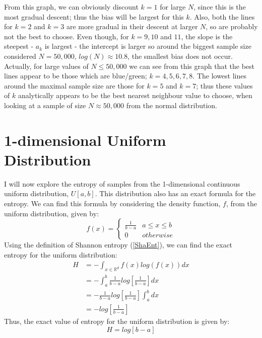 \documentclass[12pt]{report}
\begin{document}
From this graph, we can obviously discount $k=1$ for large $N$, since this is the most gradual descent; thus the bias will be largest for this $k$. Also, both the lines for $k=2$ and $k=3$ are more gradual in their descent at larger $N$, so are probably not the best to choose. Even though, for $k=9, 10$ and $11$, the slope is the steepest - $a_{k}$ is largest - the intercept is larger so around the biggest sample size considered $N=50,000$, $log(N) \approx 10.8$, the smallest bias does not occur. Actually, for large values of $N \leq 50,000$ we can see from this graph that the best lines appear to be those which are blue/green; $k = 4, 5, 6, 7, 8$. The lowest lines around the maximal sample size are those for $k=5$ and $k=7$; thus these values of $k$ analytically appears to be the best nearest neighbour value to choose, when looking at a sample of size $N \approx 50,000$ from the normal distribution.











\section{1-dimensional Uniform Distribution} \label{Uniform_d=1}

I will now explore the entropy of samples from the 1-dimensional continuous uniform distribution, $U[a, b]$. This distribution also has an exact formula for the entropy. We can find this formula by considering the density function, $f$, from the uniform distribution, given by:
\[
f(x) =  \begin{cases} 
      \frac{1}{b-a} & a \leq x \leq b \\
      0 & otherwise
   \end{cases}
\]
Using the definition of Shannon entropy (\ref{ShaEnt}), we can find the exact entropy for the uniform distribution:
\begin{align*}
H &= - \int_{x \in \mathbb{R}^d} f(x) log(f(x)) dx \\ 
&= - \int_{a}^{b} \frac{1}{b-a} log \left[ \frac{1}{b-a} \right] dx  \\
&= - \frac{1}{b-a} log \left[ \frac{1}{b-a} \right]  \int_{a}^{b} dx  \\
&= -  log  \left[ \frac{1}{b-a} \right] 
\end{align*}
Thus, the exact value of entropy for the uniform distribution is given by:
\begin{equation} \label{UnifEnt}
H = log [ b-a ]
\end{equation}
\end{document}
